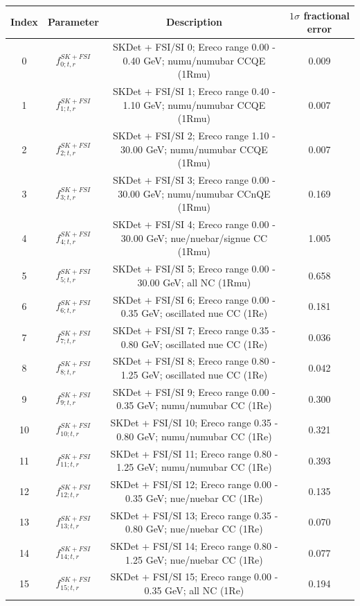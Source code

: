 \begin{tabular} { | c | c | c | c |  }
\hline 
Index & Parameter & Description & $1\sigma$ fractional error\\
\hline
0 & $f_{0; t, r}^{SK+FSI}$ & SKDet + FSI/SI  0; Ereco range 0.00 - 0.40 GeV; numu/numubar CCQE (1Rmu) & 0.009\\ 
1 & $f_{1; t, r}^{SK+FSI}$ & SKDet + FSI/SI  1; Ereco range 0.40 - 1.10 GeV; numu/numubar CCQE (1Rmu) & 0.007\\ 
2 & $f_{2; t, r}^{SK+FSI}$ & SKDet + FSI/SI  2; Ereco range 1.10 - 30.00 GeV; numu/numubar CCQE (1Rmu) & 0.007\\ 
3 & $f_{3; t, r}^{SK+FSI}$ & SKDet + FSI/SI  3; Ereco range 0.00 - 30.00 GeV; numu/numubar CCnQE (1Rmu) & 0.169\\ 
4 & $f_{4; t, r}^{SK+FSI}$ & SKDet + FSI/SI  4; Ereco range 0.00 - 30.00 GeV; nue/nuebar/signue CC (1Rmu) & 1.005\\ 
5 & $f_{5; t, r}^{SK+FSI}$ & SKDet + FSI/SI  5; Ereco range 0.00 - 30.00 GeV; all NC (1Rmu) & 0.658\\ 
6 & $f_{6; t, r}^{SK+FSI}$ & SKDet + FSI/SI  6; Ereco range 0.00 - 0.35 GeV; oscillated nue CC (1Re) & 0.181\\ 
7 & $f_{7; t, r}^{SK+FSI}$ & SKDet + FSI/SI  7; Ereco range 0.35 - 0.80 GeV; oscillated nue CC (1Re) & 0.036\\ 
8 & $f_{8; t, r}^{SK+FSI}$ & SKDet + FSI/SI  8; Ereco range 0.80 - 1.25 GeV; oscillated nue CC (1Re) & 0.042\\ 
9 & $f_{9; t, r}^{SK+FSI}$ & SKDet + FSI/SI  9; Ereco range 0.00 - 0.35 GeV; numu/numubar CC (1Re) & 0.300\\ 
10 & $f_{10; t, r}^{SK+FSI}$ & SKDet + FSI/SI 10; Ereco range 0.35 - 0.80 GeV; numu/numubar CC (1Re) & 0.321\\ 
11 & $f_{11; t, r}^{SK+FSI}$ & SKDet + FSI/SI 11; Ereco range 0.80 - 1.25 GeV; numu/numubar CC (1Re) & 0.393\\ 
12 & $f_{12; t, r}^{SK+FSI}$ & SKDet + FSI/SI 12; Ereco range 0.00 - 0.35 GeV; nue/nuebar CC (1Re) & 0.135\\ 
13 & $f_{13; t, r}^{SK+FSI}$ & SKDet + FSI/SI 13; Ereco range 0.35 - 0.80 GeV; nue/nuebar CC (1Re) & 0.070\\ 
14 & $f_{14; t, r}^{SK+FSI}$ & SKDet + FSI/SI 14; Ereco range 0.80 - 1.25 GeV; nue/nuebar CC (1Re) & 0.077\\ 
15 & $f_{15; t, r}^{SK+FSI}$ & SKDet + FSI/SI 15; Ereco range 0.00 - 0.35 GeV; all NC (1Re) & 0.194\\ 

\end{tabular}
